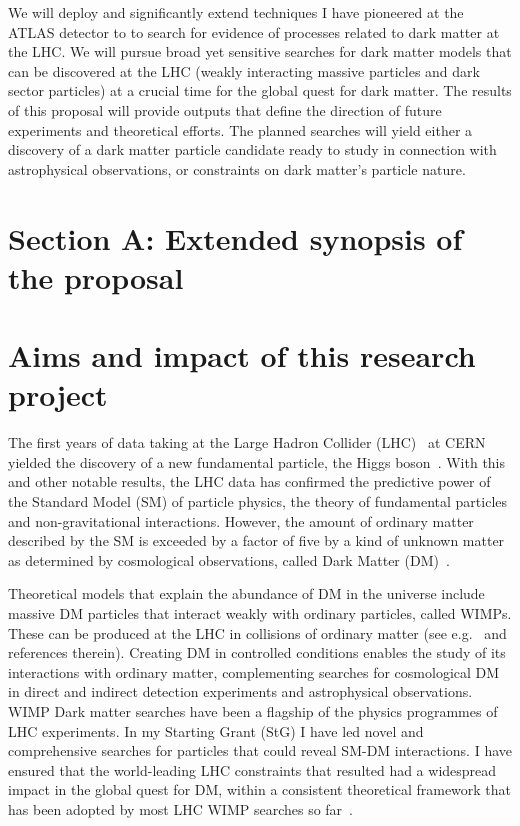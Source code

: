 \documentclass[11pt,a4paper]{article}
\begin{document}
We will deploy and significantly extend techniques I have pioneered at the ATLAS detector to to search for evidence of processes related to dark matter at the LHC. 
We will pursue broad yet sensitive searches for dark matter models that can be discovered at the LHC (weakly interacting massive particles and dark sector particles) at a crucial time for the global quest for dark matter. 
The results of this proposal will provide outputs that define the direction of future experiments and theoretical efforts. The planned searches will yield either a discovery of a dark matter particle candidate ready to study in connection with astrophysical observations, or constraints on dark matter’s particle nature. 

\clearpage

\section*{Section A: Extended synopsis of the proposal} 

\medskip

\section{Aims and impact of this research project} 
\smallskip

The first years of data taking at the Large Hadron Collider (LHC)~\cite{LHC2008} at CERN yielded the discovery of a new fundamental particle, the Higgs boson~\cite{Khachatryan:2016vau}. With this and other notable results, the LHC data has confirmed the predictive power of the Standard Model (SM) of particle physics, the theory of fundamental particles and non-gravitational interactions. However, the amount of ordinary matter described by the SM is exceeded by a factor of five by a kind of unknown matter as determined by cosmological observations, called Dark Matter (DM)~\cite{Bertone:2016nfn}. 


Theoretical models that explain the abundance of DM in the universe include massive DM particles that interact weakly with ordinary particles, called WIMPs. These can be produced at the LHC in collisions of ordinary matter (see e.g.~\cite{Boveia:2018yeb} and references therein). 
Creating DM in controlled conditions enables the study of its interactions with ordinary matter, complementing searches for cosmological DM in direct and indirect detection experiments and astrophysical observations. %
WIMP Dark matter searches have been a flagship of the physics programmes of LHC experiments. In my Starting Grant (StG) I have led novel and comprehensive searches for particles that could reveal SM-DM interactions. I have ensured that the world-leading LHC constraints that resulted had a widespread impact in the global quest for DM, within a consistent theoretical framework that has been adopted by most LHC WIMP searches so far~\cite{Abercrombie:2015wmb}.  
\end{document}
